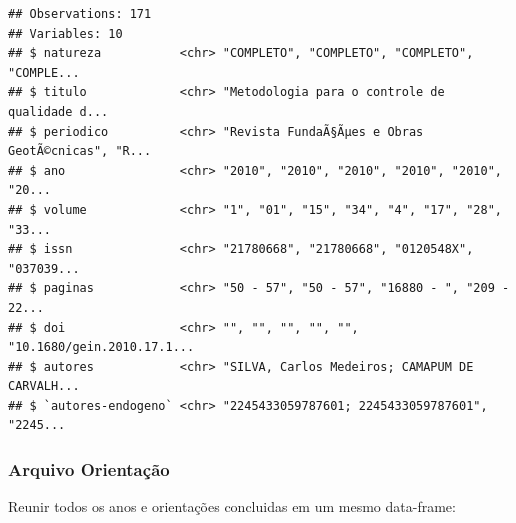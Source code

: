 \documentclass[]{article}
\newenvironment{Shaded}{\begin{snugshade}}{\end{snugshade}}
\newcommand{\ControlFlowTok}[1]{\textcolor[rgb]{0.13,0.29,0.53}{\textbf{#1}}}
\newcommand{\DecValTok}[1]{\textcolor[rgb]{0.00,0.00,0.81}{#1}}
\newcommand{\KeywordTok}[1]{\textcolor[rgb]{0.13,0.29,0.53}{\textbf{#1}}}
\newcommand{\NormalTok}[1]{#1}
\newcommand{\OperatorTok}[1]{\textcolor[rgb]{0.81,0.36,0.00}{\textbf{#1}}}
\newcommand{\StringTok}[1]{\textcolor[rgb]{0.31,0.60,0.02}{#1}}
\begin{document}
\begin{verbatim}
## Observations: 171
## Variables: 10
## $ natureza           <chr> "COMPLETO", "COMPLETO", "COMPLETO", "COMPLE...
## $ titulo             <chr> "Metodologia para o controle de qualidade d...
## $ periodico          <chr> "Revista FundaÃ§Ãµes e Obras GeotÃ©cnicas", "R...
## $ ano                <chr> "2010", "2010", "2010", "2010", "2010", "20...
## $ volume             <chr> "1", "01", "15", "34", "4", "17", "28", "33...
## $ issn               <chr> "21780668", "21780668", "0120548X", "037039...
## $ paginas            <chr> "50 - 57", "50 - 57", "16880 - ", "209 - 22...
## $ doi                <chr> "", "", "", "", "", "10.1680/gein.2010.17.1...
## $ autores            <chr> "SILVA, Carlos Medeiros; CAMAPUM DE CARVALH...
## $ `autores-endogeno` <chr> "2245433059787601; 2245433059787601", "2245...
\end{verbatim}

\hypertarget{arquivo-orientauxe7uxe3o}{%
\subsubsection{Arquivo Orientação}\label{arquivo-orientauxe7uxe3o}}

Reunir todos os anos e orientações concluidas em um mesmo data-frame:

\begin{Shaded}
\end{Shaded}
\end{document}
